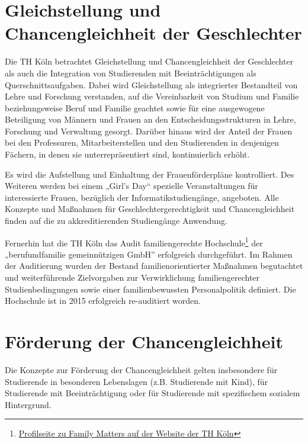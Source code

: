 \section{Gleichstellung und Chancengleichheit der
Geschlechter}\label{gleichstellung-und-chancengleichheit-der-geschlechter}

Die TH Köln betrachtet Gleichstellung und Chancengleichheit der
Geschlechter als auch die Integration von Studierenden mit
Beeinträchtigungen als Querschnittsaufgaben. Dabei wird Gleichstellung
als integrierter Bestandteil von Lehre und Forschung verstanden, auf die
Vereinbarkeit von Studium und Familie beziehungsweise Beruf und Familie
geachtet sowie für eine ausgewogene Beteiligung von Männern und Frauen
an den Entscheidungsstrukturen in Lehre, Forschung und Verwaltung
gesorgt. Darüber hinaus wird der Anteil der Frauen bei den Professuren,
Mitarbeiterstellen und den Studierenden in denjenigen Fächern, in denen
sie unterrepräsentiert sind, kontinuierlich erhöht.

Es wird die Aufstellung und Einhaltung der Frauenförderpläne
kontrolliert. Des Weiteren werden bei einem „Girl's Day`` spezielle
Veranstaltungen für interessierte Frauen, bezüglich der
Informatikstudiengänge, angeboten. Alle Konzepte und Maßnahmen für
Geschlechtergerechtigkeit und Chancengleichheit finden auf die zu
akkreditierenden Studiengänge Anwendung.

Fernerhin hat die TH Köln das Audit familiengerechte
Hochschule\footnote{\href{https://www.th-koeln.de/hochschule/familienfreundlichkeit_3759.php}{Profilseite
  zu Family Matters auf der Website der TH Köln}} der „berufundfamilie
gemeinnützigen GmbH'' erfolgreich durchgeführt. Im Rahmen der
Auditierung wurden der Bestand familienorientierter Maßnahmen
begutachtet und weiterführende Zielvorgaben zur Verwirklichung
familiengerechter Studienbedingungen sowie einer familienbewussten
Personalpolitik definiert. Die Hochschule ist in 2015 erfolgreich
re-auditiert worden.

\section{Förderung der
Chancengleichheit}\label{fuxf6rderung-der-chancengleichheit}

Die Konzepte zur Förderung der Chancengleichheit gelten insbesondere für
Studierende in besonderen Lebenslagen (z.B. Studierende mit Kind), für
Studierende mit Beeinträchtigung oder für Studierende mit spezifischem
sozialem Hintergrund.

